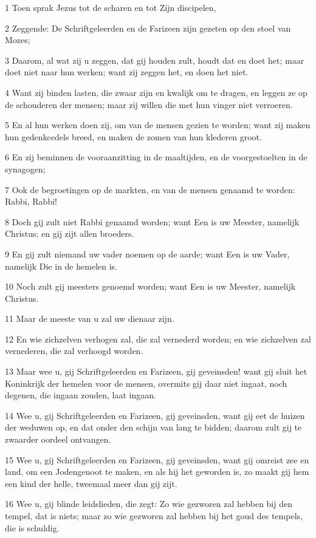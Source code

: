 \par 1 Toen sprak Jezus tot de scharen en tot Zijn discipelen,
\par 2 Zeggende: De Schriftgeleerden en de Farizeen zijn gezeten op den stoel van Mozes;
\par 3 Daarom, al wat zij u zeggen, dat gij houden zult, houdt dat en doet het; maar doet niet naar hun werken; want zij zeggen het, en doen het niet.
\par 4 Want zij binden lasten, die zwaar zijn en kwalijk om te dragen, en leggen ze op de schouderen der mensen; maar zij willen die met hun vinger niet verroeren.
\par 5 En al hun werken doen zij, om van de mensen gezien te worden; want zij maken hun gedenkcedels breed, en maken de zomen van hun klederen groot.
\par 6 En zij beminnen de vooraanzitting in de maaltijden, en de voorgestoelten in de synagogen;
\par 7 Ook de begroetingen op de markten, en van de mensen genaamd te worden: Rabbi, Rabbi!
\par 8 Doch gij zult niet Rabbi genaamd worden; want Een is uw Meester, namelijk Christus; en gij zijt allen broeders.
\par 9 En gij zult niemand uw vader noemen op de aarde; want Een is uw Vader, namelijk Die in de hemelen is.
\par 10 Noch zult gij meesters genoemd worden; want Een is uw Meester, namelijk Christus.
\par 11 Maar de meeste van u zal uw dienaar zijn.
\par 12 En wie zichzelven verhogen zal, die zal vernederd worden; en wie zichzelven zal vernederen, die zal verhoogd worden.
\par 13 Maar wee u, gij Schriftgeleerden en Farizeen, gij geveinsden! want gij sluit het Koninkrijk der hemelen voor de mensen, overmits gij daar niet ingaat, noch degenen, die ingaan zouden, laat ingaan.
\par 14 Wee u, gij Schriftgeleerden en Farizeen, gij geveinsden, want gij eet de huizen der weduwen op, en dat onder den schijn van lang te bidden; daarom zult gij te zwaarder oordeel ontvangen.
\par 15 Wee u, gij Schriftgeleerden en Farizeen, gij geveinsden, want gij omreist zee en land, om een Jodengenoot te maken, en als hij het geworden is, zo maakt gij hem een kind der helle, tweemaal meer dan gij zijt.
\par 16 Wee u, gij blinde leidslieden, die zegt: Zo wie gezworen zal hebben bij den tempel, dat is niets; maar zo wie gezworen zal hebben bij het goud des tempels, die is schuldig.
